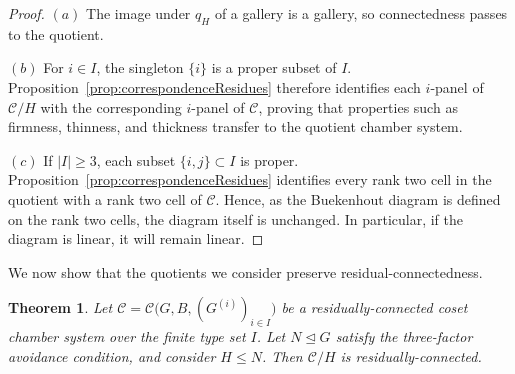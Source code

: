 \documentclass[11pt,letterpaper]{amsart}
\newtheorem{thm}[prop]{Theorem}
\newcommand{\CC}{\mathcal{C}}
\begin{document}
\begin{proof}
$(a)$ The image under $q_H$ of a gallery is a gallery, so connectedness passes to the
quotient.  

$(b)$ For $i\in I$, the singleton $\{i\}$ is a proper subset of $I$.
Proposition~\ref{prop:correspondenceResidues} therefore identifies each
$i$-panel of $\CC/H$ with the corresponding $i$-panel of $\CC$, proving
that properties such as firmness, thinness, and thickness transfer to the quotient chamber system.

$(c)$ If $|I|\geq3$, each subset $\{i,j\}\subset I$ is proper. Proposition~\ref{prop:correspondenceResidues}
identifies every rank two cell in the quotient with a rank two cell
of $\CC$.  Hence, as the Buekenhout diagram is defined on the rank two cells, the diagram itself is
unchanged. In particular, if the diagram is linear, it will remain linear.
\end{proof}

We now show that the quotients we consider preserve residual-connectedness.

\begin{thm}
\label{thm:quotient_RC}
Let $ \CC=\CC\bigl(G,B,(G^{(i)})_{i\in I}\bigr)$
be a residually-connected coset chamber system over the finite type set $I$.  Let $N\trianglelefteq G$ satisfy
the three-factor avoidance condition, and consider $H\leq N$.  Then $\CC/H$ is
residually-connected.
\end{thm}
\end{document}
